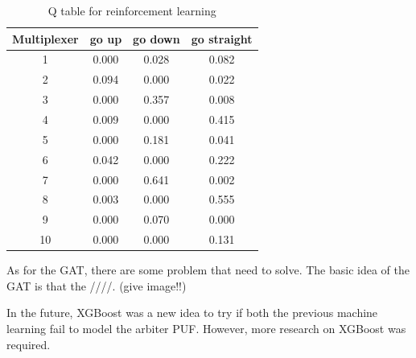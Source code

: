 \begin{table}[ht]
    \center
    \begin{tabular}{c|ccc}
    Multiplexer & go up & go down & go straight\\
    \hline
    1 & 0.000 & 0.028 & 0.082\\
    2 & 0.094 & 0.000 & 0.022\\
    3 & 0.000 & 0.357 & 0.008\\
    4 & 0.009 & 0.000 & 0.415\\
    5 & 0.000 & 0.181 & 0.041\\
    6 & 0.042 & 0.000 & 0.222\\
    7 & 0.000 & 0.641 & 0.002\\
    8 & 0.003 & 0.000 & 0.555\\
    9 & 0.000 & 0.070 & 0.000\\
    10 & 0.000 & 0.000 & 0.131\\
    \end{tabular}
    \caption{Q table for reinforcement learning}
    \label{tab:table1}
    \end{table}

As for the GAT, there are some problem that need to solve. The basic idea of the GAT is that the ////. (give image!!)


In the future, XGBoost was a new idea to try if both the previous machine learning fail to model the arbiter PUF. However, more research on XGBoost was required.



